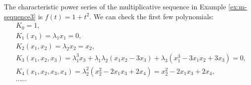 \begin{example}
    The characteristic power series of the multiplicative sequence in Example \ref{ex:m-sequence3} is $f(t) = 1 + t^2$.
    We can check the first few polynomials:
    \begin{align*}
        &K_0 = 1, \\
        &K_1(x_1) = \lambda_1 x_1 = 0, \\
        &K_2(x_1,x_2) = \lambda_2 x_2 = x_2, \\
        &K_3(x_1,x_2,x_3) = \lambda_1^3 x_3 + \lambda_1\lambda_2 (x_1 x_2 - 3 x_3) + \lambda_3 (x_1^3 - 3 x_1 x_2 + 3 x_3) = 0, \\
        &K_4(x_1,x_2,x_3,x_4) = \lambda_2^2 (x_2^2 - 2 x_1 x_3 + 2 x_4) = x_2^2 - 2 x_1 x_3 + 2 x_4, \\[4pt]
        &\cdots\cdots
    \end{align*}
\end{example}

